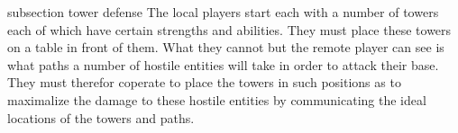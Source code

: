 {subsection tower defense}
The local players start each with a number of towers each of which have certain strengths and abilities. They must place these towers on a table in front of them. What they cannot but the remote player can see is what paths a number of hostile entities will take in order to attack their base. They must therefor coperate to place the towers in such positions as to maximalize the damage to these hostile entities by communicating the ideal locations of the towers and paths. 